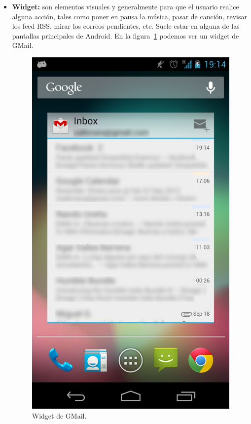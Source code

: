 \begin{itemize}
\item \textbf{Widget:} son elementos visuales y generalmente para que el usuario realice alguna acción, tales como poner en pausa la música, pasar de canción, revisar los feed RSS, mirar los correos pendientes, etc. Suele estar en alguna de las pantallas principales de Android. En la figura~\ref{fig:widget} podemos ver un widget de GMail.
 
\begin{figure}[h]
  \centering
    \includegraphics[scale=0.2]{./Android/imagenes/widget.png}
  \caption{Widget de GMail.}
  \label{fig:widget}
\end{figure}

\end{itemize}

